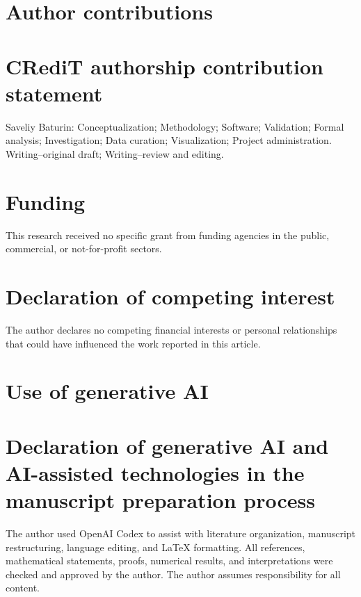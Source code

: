 \documentclass[review,onefignum,onetabnum]{siamonline250211}
\begin{document}
\ifdefined\SIMODSsubmission
\section*{Author contributions}
\else
\section*{CRediT authorship contribution statement}
\fi
Saveliy Baturin: Conceptualization; Methodology; Software; Validation; Formal
analysis; Investigation; Data curation; Visualization; Project administration.
Writing--original draft; Writing--review and editing.

\section*{Funding}
This research received no specific grant from funding agencies in the public,
commercial, or not-for-profit sectors.

\section*{Declaration of competing interest}
The author declares no competing financial interests or personal relationships
that could have influenced the work reported in this article.

\ifdefined\SIMODSsubmission
\section*{Use of generative AI}
\else
\section*{Declaration of generative AI and AI-assisted technologies in the manuscript preparation process}
\fi
The author used OpenAI Codex to assist with literature organization,
manuscript restructuring, language editing, and \LaTeX{} formatting.  All
references, mathematical statements, proofs, numerical results, and
interpretations were checked and approved by the author.  The author assumes
responsibility for all content.

\footnotesize
\ifdefined\SIMODSsubmission


\else
  \setlength{\bibsep}{1pt}
  \ifdefined\SPsubmission
  
  
  \else
  
  
  \fi
\fi
\end{document}
